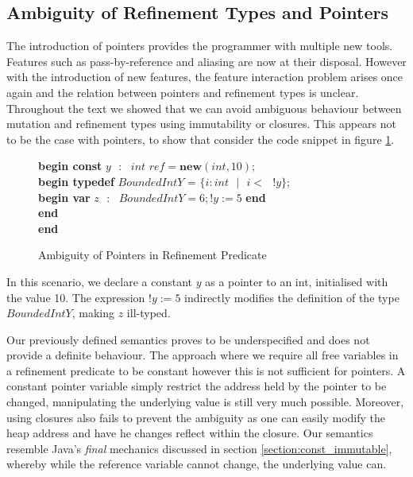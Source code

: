 \documentclass[a4paper,12pt]{report}
\newenvironment{tabs}[1]
 {\flushleft\TabPositions{#1}}
 {\endflushleft}
\begin{document}
\subsection{Ambiguity of Refinement Types and Pointers}
The introduction of pointers provides the programmer with multiple new tools. 
Features such as pass-by-reference and aliasing are now at their disposal. 
However with the introduction of new features, the feature interaction problem 
arises once again and the relation between pointers and refinement types is 
unclear. Throughout the text we showed that we can avoid ambiguous behaviour 
between mutation and refinement types using immutability or closures. This appears 
not to be the case with pointers, to show that consider the code snippet in figure
\ref{fig:amb_refinement_pointers}. 

\begin{figure} [H]
  \begin{tabs}{1cm,2cm}
    \textbf{begin const }$y\text{ }:\text{ } int\textit{ ref} = \textbf{new}(int, 10);$\\
    \tab\textbf{begin typedef }$BoundedIntY$ = $\{i : int\text{ }|\text{ }i <\text{ }!y\}$; \\ 
    \tab\tab\textbf{begin var }$z\text{ }:\text{ }BoundedIntY = 6;!y := 5$\textbf { end} \\
    \tab\textbf {end} \\
    \textbf{end}
  \end{tabs}  
  \caption{Ambiguity of Pointers in Refinement Predicate}
  \label{fig:amb_refinement_pointers}
\end{figure}

\par
In this scenario, we declare a constant $y$ as a pointer to an int, 
initialised with the value 10. The expression $!y := 5$ indirectly modifies 
the definition of the type $BoundedIntY$, making $z$ ill-typed. 

\par
Our previously defined semantics proves to be underspecified and does not 
provide a definite behaviour. The approach where we require all free variables in a 
refinement predicate to be constant however this is not sufficient for pointers. 
A constant pointer variable simply restrict the address held by the pointer to be 
changed, manipulating the underlying value is still very much possible. 
Moreover, using closures also fails to prevent the ambiguity as one can easily 
modify the heap address and have he changes reflect within the closure. Our  
semantics resemble Java's \textit{final} mechanics discussed in section \ref{section:const_immutable}, 
whereby while the reference variable cannot change, the underlying value can.
\end{document}

